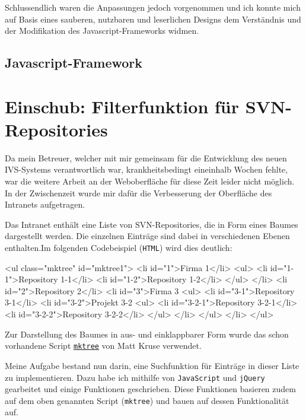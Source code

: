 \documentclass[xcolor=dvipsnames,11pt,paper=a4paper]{report}
\begin{document}
Schlussendlich waren die Anpassungen jedoch vorgenommen und ich konnte mich auf
Basis eines sauberen, nutzbaren und leserlichen Designs dem Verständnis und der
Modifikation des Javascript-Frameworks widmen.


\subsection{Javascript-Framework}



\section{Einschub: Filterfunktion für SVN-Repositories}

Da mein Betreuer, welcher mit mir gemeinsam für die Entwicklung des neuen IVS-Systems
verantwortlich war, krankheitsbedingt eineinhalb Wochen fehlte, war die weitere
Arbeit an der Weboberfläche für diese Zeit leider nicht möglich. In der Zwischenzeit
wurde mir dafür die Verbesserung der Oberfläche des Intranets aufgetragen.

Das Intranet enthält eine Liste von SVN-Repositories, die in Form eines Baumes dargestellt
werden. Die einzelnen Einträge sind dabei in verschiedenen Ebenen enthalten.Im folgenden
Codebeispiel (\texttt{HTML}) wird dies deutlich:

\begin{code}[language=html, caption={Beispielcode zu den SVN-Repositories im Intranet}]
<ul class="mktree" id="mktree1">
	<li id="1">Firma 1</li>
		<ul>
			<li id="1-1">Repository 1-1</li>
			<li id="1-2">Repository 1-2</li>
		</ul>
	</li>
	<li id="2">Repository 2</li>
	<li id="3">Firma 3
		<ul>
			<li id="3-1">Repository 3-1</li>
			<li id="3-2">Projekt 3-2
				<ul>
					<li id="3-2-1">Repository 3-2-1</li>
					<li id="3-2-2">Repository 3-2-2</li>
				</ul>
			</li>
		</ul>
	</li>
</ul>
\end{code}

Zur Darstellung des Baumes in aus- und einklappbarer Form wurde das schon vorhandene
Script \href{http://www.mattkruse.com/javascript/mktree}{\texttt{mktree}} von
Matt Kruse verwendet.

Meine Aufgabe bestand nun darin, eine Suchfunktion für Einträge in dieser Liste
zu implementieren. Dazu habe ich mithilfe von \texttt{JavaScript} und \texttt{jQuery}
gearbeitet und einige Funktionen geschrieben. Diese Funktionen basieren zudem auf
dem oben genannten Script (\texttt{mktree}) und bauen auf dessen Funktionalität
auf.
\end{document}
